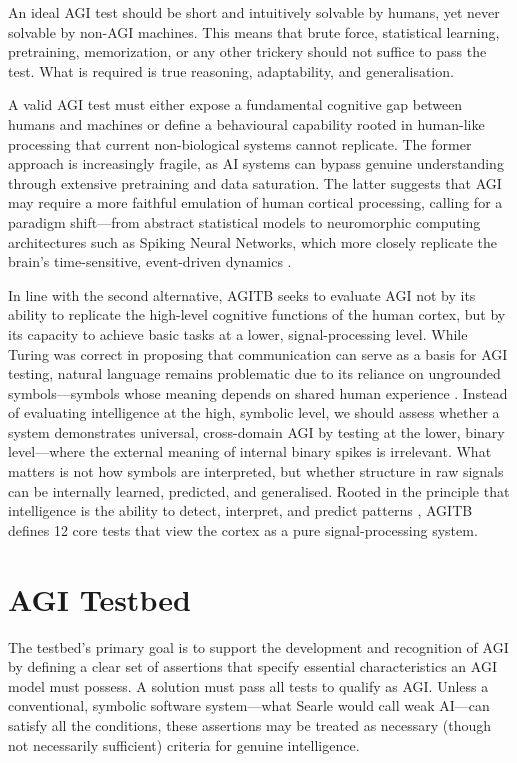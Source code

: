 \documentclass{article}
\begin{document}
An ideal AGI test should be short and intuitively solvable by humans, yet never solvable by non-AGI machines. This means that brute force, statistical learning, pretraining, memorization, or any other trickery should not suffice to pass the test. What is required is true reasoning, adaptability, and generalisation.

A valid AGI test must either expose a fundamental cognitive gap between humans and machines or define a behavioural capability rooted in human-like processing that current non-biological systems cannot replicate. The former approach is increasingly fragile, as AI systems can bypass genuine understanding through extensive pretraining and data saturation. The latter suggests that AGI may require a more faithful emulation of human cortical processing, calling for a paradigm shift—from abstract statistical models to neuromorphic computing architectures such as Spiking Neural Networks, which more closely replicate the brain's time-sensitive, event-driven dynamics \cite{Maass1997}.

In line with the second alternative, AGITB seeks to evaluate AGI not by its ability to replicate the high-level cognitive functions of the human cortex, but by its capacity to achieve basic tasks at a lower, signal-processing level. While Turing was correct in proposing that communication can serve as a basis for AGI testing, natural language remains problematic due to its reliance on ungrounded symbols—symbols whose meaning depends on shared human experience \cite{Harnad1990}. Instead of evaluating intelligence at the high, symbolic level, we should assess whether a system demonstrates universal, cross-domain AGI by testing at the lower, binary level—where the external meaning of internal binary spikes is irrelevant. What matters is not how symbols are interpreted, but whether structure in raw signals can be internally learned, predicted, and generalised. Rooted in the principle that intelligence is the ability to detect, interpret, and predict patterns \cite{Hawkins2004}, AGITB defines 12 core tests that view the cortex as a pure signal-processing system.



\section{AGI Testbed}

The testbed's primary goal is to support the development and recognition of AGI by defining a clear set of assertions that specify essential characteristics an AGI model must possess. A solution must pass all tests to qualify as AGI. Unless a conventional, symbolic software system—what Searle \cite{Searle1980} would call weak AI—can satisfy all the conditions, these assertions may be treated as necessary (though not necessarily sufficient) criteria for genuine intelligence.
\end{document}
